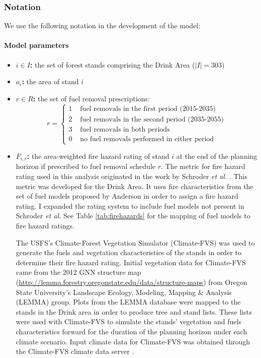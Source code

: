 \subsubsection{Notation}
We use the following notation in the development of the model:

\paragraph{Model parameters}
\begin{itemize}
\item \textbf{$i \in I$:} the set of forest stands comprising the Drink Area ($|I| = 303$)

\item \textbf{$a_i$:} the area of stand $i$

\item \textbf{$r \in R$:} the set of fuel removal prescriptions:
	$$
	r =
	\begin{cases}
	1 &\text{ fuel removals in the first period (2015-2035)}\\
	2 &\text{ fuel removals in the second period (2035-2055)}\\
	3 &\text{ fuel removals in both periods}\\
	0 &\text{ no fuel removals performed in either period}
	\end{cases}
	$$
	
\item \textbf{$F_{i,r}$:} the area-weighted fire hazard rating of stand $i$ at the end of the planning horizon if prescribed to fuel removal schedule $r$. The metric for fire hazard rating used in this analysis originated in the work by Schroder \textit{et al.} \cite{schroder2016multi}. This metric was developed for the Drink Area. It uses fire characteristics from the set of fuel models proposed by Anderson \cite{anderson1982aids} in order to assign a fire hazard rating. I expanded the rating system to include fuel models not present in Schroder \textit{et al.} See Table \ref{tab:firehazards} for the mapping of fuel models to fire hazard ratings.

The USFS's Climate-Forest Vegetation Simulator (Climate-FVS) was used to generate the fuels and vegetation characteristics of the stands in order to determine their fire hazard rating. Initial vegetation data for Climate-FVS came from the 2012 GNN structure map (\url{http://lemma.forestry.oregonstate.edu/data/structure-maps}) from Oregon State University's Landscape Ecology, Modeling, Mapping \& Analysis (LEMMA) group. Plots from the LEMMA database were mapped to the stands in the Drink area in order to produce tree and stand lists. These lists were used with Climate-FVS to simulate the stands' vegetation and fuels characteristics forward for the duration of the planning horizon under each climate scenario. Input climate data for Climate-FVS was obtained through the Climate-FVS climate data server \cite{climateFVSReadyData}.


\end{itemize}
